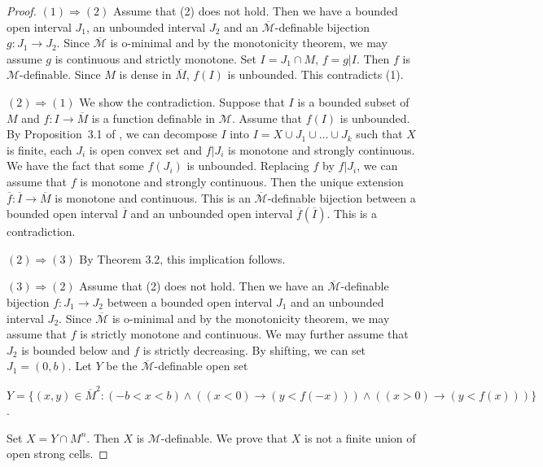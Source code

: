 \documentclass{amsart}
\theoremstyle{definition}
\theoremstyle{plain}
\newcommand{\ov}[1]{\overline{#1}}
\def \M {{\mathcal M}}
\begin{document}
\begin{proof}
$(1) \Rightarrow (2)$
Assume that (2) does not hold.
Then we have a bounded open interval $J_1$, an unbounded interval $J_2$ and 
an $\overline{\M}$-definable bijection $g:J_1 \to J_2$.
Since $\overline{\M}$ is o-minimal and by the monotonicity theorem,
we may assume $g$ is continuous and strictly monotone.
Set $I=J_1 \cap M$, $f=g|I$.
Then $f$ is $\mathcal M$-definable.
 Since $M$ is dense in $\ov{M}$,
 $f(I)$ is unbounded.
This contradicts (1).


$(2) \Rightarrow (1)$
We show the contradiction.
Suppose that $I$ is a bounded subset of $M$ and $f:I \to \overline{M}$ is a function definable in $\mathcal{M}$.
Assume that $f(I)$ is unbounded.
By Proposition~3.1 of \cite{W2}, 
we can decompose $I$ into $I=X \cup J_1 \cup \dots \cup J_k$ such that 
$X$ is finite, each $J_i$ is open convex set and $f|J_i$ is monotone and strongly continuous.
We have the fact that some $f(J_i)$ is unbounded.
Replacing $f$ by $f|J_i$, 
we can assume that $f$ is  monotone and strongly continuous.
Then the unique extension $\overline{f}:\overline{I} \to \overline{M}$ is monotone and continuous.
This is an $\overline{\M}$-definable bijection between a bounded open interval $\overline{I}$ and an unbounded open interval $\overline{f}(\overline{I})$.
This is a contradiction.


$(2) \Rightarrow (3)$
%
By Theorem 3.2, this implication follows.
%
%
%

$(3) \Rightarrow (2)$
Assume that (2) does not hold.
Then we have an $\overline{\M}$-definable bijection $f:J_1 \to J_2$ between a bounded open interval $J_1$ and an unbounded interval $J_2$.
Since $\overline{\M}$ is o-minimal and by the monotonicity theorem,
we may assume that $f$ is strictly monotone and continuous.
We may further assume that $J_2$ is bounded below and $f$ is strictly decreasing.
By shifting, we can set $J_1=(0, b)$.
Let $Y$ be the $\overline{\M}$-definable open set

$Y=\{(x, y) \in \overline{M}^2 : (-b<x<b) \land ((x<0) \to (y<f(-x))) \land ((x>0) \to (y<f(x)))\}$.

Set $X=Y \cap M^n$.
Then $X$ is $\mathcal{M}$-definable.
We prove that $X$ is not a finite union of open strong cells.


\end{proof}
\end{document}
